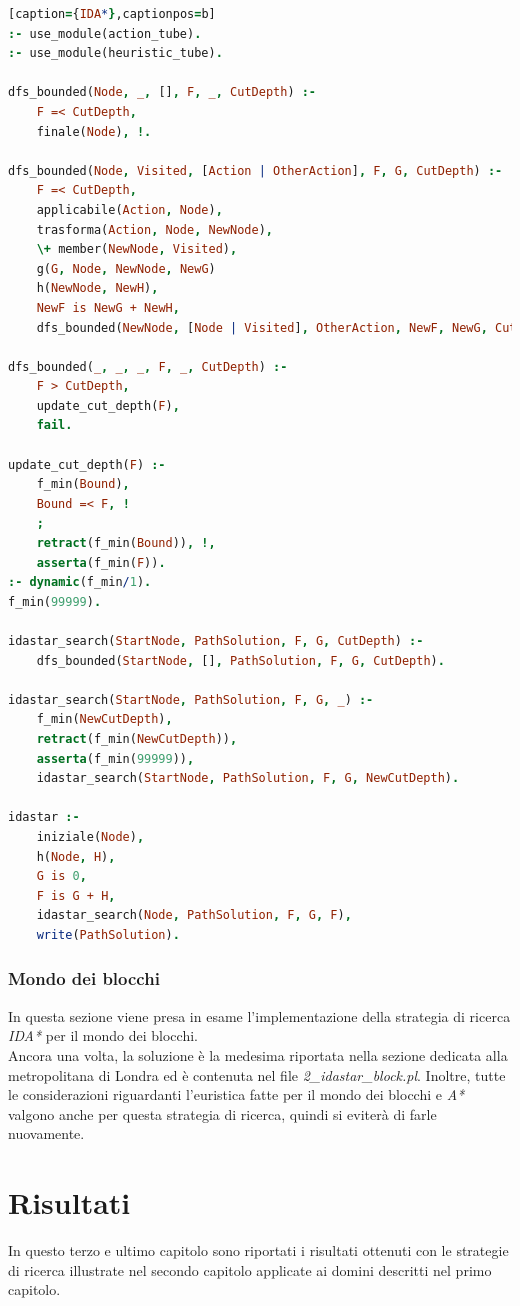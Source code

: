 \documentclass[12pt]{report}
\begin{document}
\begin{lstlisting}[language=Prolog][caption={IDA*},captionpos=b]
:- use_module(action_tube).
:- use_module(heuristic_tube).

dfs_bounded(Node, _, [], F, _, CutDepth) :-
	F =< CutDepth,
	finale(Node), !.

dfs_bounded(Node, Visited, [Action | OtherAction], F, G, CutDepth) :-
	F =< CutDepth,
	applicabile(Action, Node),
	trasforma(Action, Node, NewNode),
	\+ member(NewNode, Visited),
	g(G, Node, NewNode, NewG)
	h(NewNode, NewH),
	NewF is NewG + NewH,
	dfs_bounded(NewNode, [Node | Visited], OtherAction, NewF, NewG, CutDepth).

dfs_bounded(_, _, _, F, _, CutDepth) :-
	F > CutDepth,
	update_cut_depth(F),
	fail.

update_cut_depth(F) :-
	f_min(Bound),
	Bound =< F, !
	;
	retract(f_min(Bound)), !,
	asserta(f_min(F)).
:- dynamic(f_min/1).
f_min(99999).

idastar_search(StartNode, PathSolution, F, G, CutDepth) :- 
	dfs_bounded(StartNode, [], PathSolution, F, G, CutDepth).

idastar_search(StartNode, PathSolution, F, G, _) :-
	f_min(NewCutDepth),
	retract(f_min(NewCutDepth)), 
	asserta(f_min(99999)),
	idastar_search(StartNode, PathSolution, F, G, NewCutDepth).

idastar :- 
	iniziale(Node),
	h(Node, H),
	G is 0,
	F is G + H,
	idastar_search(Node, PathSolution, F, G, F),
	write(PathSolution).
\end{lstlisting}

\subsection{Mondo dei blocchi}
In questa sezione viene presa in esame l'implementazione della strategia di ricerca \emph{IDA*} per il mondo dei blocchi.\\
Ancora una volta, la soluzione è la medesima riportata nella sezione dedicata alla metropolitana di Londra ed è contenuta nel file \emph{2\_idastar\_block.pl}.
Inoltre, tutte le considerazioni riguardanti l'euristica fatte per il mondo dei blocchi e \emph{A*} valgono anche per questa strategia di ricerca, quindi si eviterà di farle nuovamente.

\chapter{Risultati}
In questo terzo e ultimo capitolo sono riportati i risultati ottenuti con le strategie di ricerca illustrate nel secondo capitolo applicate ai domini descritti nel primo capitolo.
\end{document}
